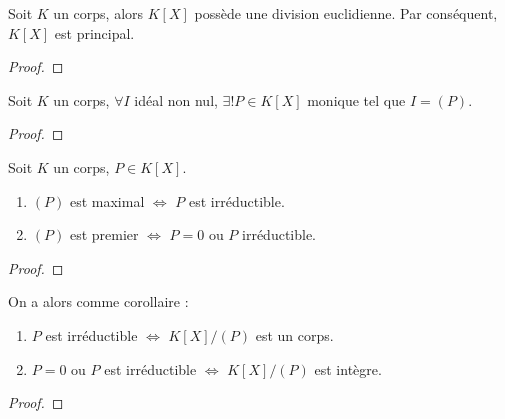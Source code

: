\begin{proposition}
	Soit $K$ un corps, alors $K[X]$ possède une division euclidienne. Par
	conséquent, $K[X]$ est principal.
\end{proposition}

\begin{proof}
	
\end{proof}

\begin{proposition}
	Soit $K$ un corps,
	$\forall I$ idéal non nul, $\exists ! P \in K[X]$ monique tel que $I = (P)$.
\end{proposition}

\begin{proof}
	
\end{proof}

\begin{proposition}
	Soit $K$ un corps, $P \in K[X]$.
	\begin{enumerate}
		\item $(P)$ est maximal $\Leftrightarrow$ $P$ est irréductible.
		\item $(P)$ est premier $\Leftrightarrow$ $P = 0$ ou $P$
			irréductible.
	\end{enumerate}
\end{proposition}

\begin{proof}
	
\end{proof}

On a alors comme corollaire :

\begin{corollary}
	\begin{enumerate}
		\item $P$ est irréductible $\Leftrightarrow$ $K[X]/(P)$ est un corps.
		\item $P = 0$ ou $P$ est irréductible $\Leftrightarrow$ $K[X]/(P)$ est
			intègre.
	\end{enumerate}
\end{corollary}

\begin{proof}
	
\end{proof}
